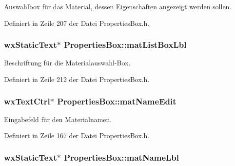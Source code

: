 Auswahlbox für das Material, dessen Eigenschaften angezeigt werden sollen. 



Definiert in Zeile 207 der Datei Properties\-Box.\-h.

\hypertarget{classPropertiesBox_aa08a220302b1d89a196dc7e03a390bd6}{
\subsubsection[{mat\-List\-Box\-Lbl}]{\setlength{\rightskip}{0pt plus 5cm}wx\-Static\-Text$\ast$ Properties\-Box\-::mat\-List\-Box\-Lbl\hspace{0.3cm}{\ttfamily [private]}}}\label{classPropertiesBox_aa08a220302b1d89a196dc7e03a390bd6}


Beschriftung für die Materialauswahl-\/\-Box. 



Definiert in Zeile 212 der Datei Properties\-Box.\-h.

\hypertarget{classPropertiesBox_aba989cc01ddce5251f021419bfe3408f}{
\subsubsection[{mat\-Name\-Edit}]{\setlength{\rightskip}{0pt plus 5cm}wx\-Text\-Ctrl$\ast$ Properties\-Box\-::mat\-Name\-Edit\hspace{0.3cm}{\ttfamily [private]}}}\label{classPropertiesBox_aba989cc01ddce5251f021419bfe3408f}


Eingabefeld für den Materialnamen. 



Definiert in Zeile 167 der Datei Properties\-Box.\-h.

\hypertarget{classPropertiesBox_ae07827304c19b4e71532fed5a4c65bb0}{
\subsubsection[{mat\-Name\-Lbl}]{\setlength{\rightskip}{0pt plus 5cm}wx\-Static\-Text$\ast$ Properties\-Box\-::mat\-Name\-Lbl\hspace{0.3cm}{\ttfamily [private]}}}\label{classPropertiesBox_ae07827304c19b4e71532fed5a4c65bb0}


